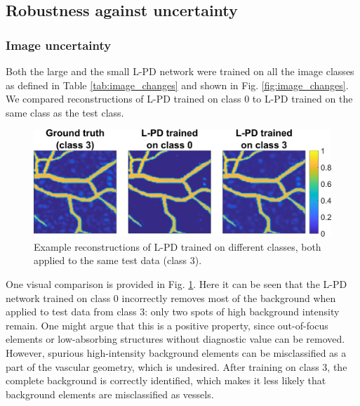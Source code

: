 \documentclass[journal]{IEEEtran}
\begin{document}
\subsection{Robustness against uncertainty}\label{sec:results_robustness}
\subsubsection{Image uncertainty} Both the large and the small L-PD network were trained on all the image classes as defined in Table \ref{tab:image_changes} and shown in Fig. \ref{fig:image_changes}. We compared reconstructions of L-PD trained on class 0 to L-PD trained on the same class as the test class. 

\begin{figure}[ht!]
\centering
\includegraphics[width=\linewidth]{images/image_changes_im.png}
\caption{Example reconstructions of L-PD trained on different classes, both applied to the same test data (class 3).}
\label{fig:image_changes_result}
\vspace{-3mm}
\end{figure}

One visual comparison is provided in Fig. \ref{fig:image_changes_result}. Here it can be seen that the L-PD network trained on class 0 incorrectly removes most of the background when applied to test data from class 3: only two spots of high background intensity remain. One might argue that this is a positive property, since out-of-focus elements or low-absorbing structures without diagnostic value can be removed. However, spurious high-intensity background elements can be misclassified as a part of the vascular geometry, which is undesired. After training on class 3, the complete background is correctly identified, which makes it less likely that background elements are misclassified as vessels. 
\end{document}
